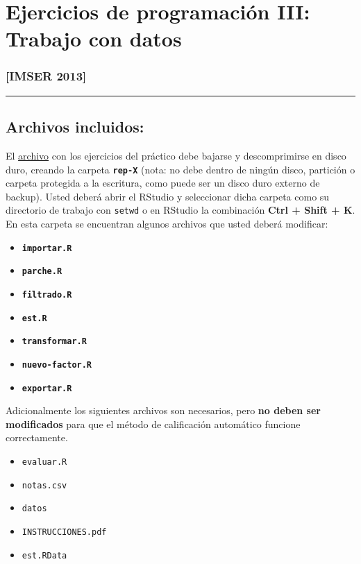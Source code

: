 \documentclass[]{article}
\author{}
\date{}
\begin{document}
\section{Ejercicios de programación III: Trabajo con datos}

\subsubsection{{[}IMSER 2013{]}}

\begin{center}\rule{3in}{0.4pt}\end{center}

\subsection{Archivos incluidos:}

El \href{http://goo.gl/eFUKY}{archivo} con los ejercicios del práctico
debe bajarse y descomprimirse en disco duro, creando la carpeta
\textbf{\texttt{rep-X}} (nota: no debe dentro de ningún disco, partición
o carpeta protegida a la escritura, como puede ser un disco duro externo
de backup). Usted deberá abrir el RStudio y seleccionar dicha carpeta
como su directorio de trabajo con \texttt{setwd} o en RStudio la
combinación \textbf{Ctrl + Shift + K}. En esta carpeta se encuentran
algunos archivos que usted deberá modificar:

\begin{itemize}
\item
  \textbf{\texttt{importar.R}}
\item
  \textbf{\texttt{parche.R}}
\item
  \textbf{\texttt{filtrado.R}}
\item
  \textbf{\texttt{est.R}}
\item
  \textbf{\texttt{transformar.R}}
\item
  \textbf{\texttt{nuevo-factor.R}}
\item
  \textbf{\texttt{exportar.R}}
\end{itemize}

Adicionalmente los siguientes archivos son necesarios, pero \textbf{no
deben ser modificados} para que el método de calificación automático
funcione correctamente.

\begin{itemize}
\item
  \texttt{evaluar.R}
\item
  \texttt{notas.csv}
\item
  \texttt{datos}
\item
  \texttt{INSTRUCCIONES.pdf}
\item
  \texttt{est.RData}
\end{itemize}
\end{document}
